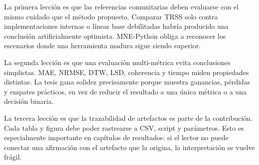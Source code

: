 La primera lección es que las referencias comunitarias deben evaluarse con el mismo cuidado que el método propuesto. Comparar TRSS solo contra implementaciones internas o líneas base debilitadas habría producido una conclusión artificialmente optimista. MNE-Python obliga a reconocer los escenarios donde una herramienta madura sigue siendo superior.

La segunda lección es que una evaluación multi-métrica evita conclusiones simplistas. MAE, NRMSE, DTW, LSD, coherencia y tiempo miden propiedades distintas. La tesis gana solidez precisamente porque muestra ganancias, pérdidas y empates prácticos, en vez de reducir el resultado a una única métrica o a una decisión binaria.

La tercera lección es que la trazabilidad de artefactos es parte de la contribución. Cada tabla y figura debe poder rastrearse a CSV, script y parámetros. Esto es especialmente importante en capítulos de resultados: si el lector no puede conectar una afirmación con el artefacto que la origina, la interpretación se vuelve frágil.
